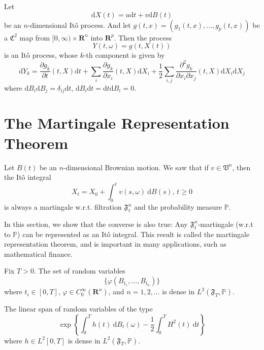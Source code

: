 \begin{theorem}
    Let
    \[
        \mathrm{d}X(t) = u \mathrm{d}t + v \mathrm{d}B(t)
    \]
    be an $n$-dimensional Itô process. And let $g(t,x) = (g_1(t,x), \ldots, g_p(t,x))$ be a $\mathfrak{C}^2$ map from $[0, \infty) \times \textbf{R}^n$ into $\textbf{R}^p$. Then the process 
    \[
        Y(t, \omega) = g(t, X(t))
    \]
    is an Itô process, whose $k$-th component is given by 
    \[
        \mathrm{d}Y_k = \frac{\partial g_k}{\partial t}(t, X) \mathrm{d}t + \sum_i \frac{\partial g_k}{\partial x_i}(t, X) \mathrm{d}X_i + \frac{1}{2} \sum_{i,j} \frac{\partial^2 g_k}{\partial x_i \partial x_j} (t,X) \mathrm{d}X_i \mathrm{d}X_j
    \]
    where $\mathrm{d}B_i \mathrm{d}B_j = \delta_{ij}\mathrm{d}t$, $\mathrm{d}B_i \mathrm{d}t = \mathrm{d}t \mathrm{d}B_i = 0$.
\end{theorem}

\section{The Martingale Representation Theorem}

Let $B(t)$ be an $n$-dimensional Brownian motion. We saw that if $v \in \mathfrak{V}^n$, then the Itô integral
\begin{equation*}
    X_t = X_0 + \int_0^t v(s, \omega) ~\mathrm{d}B(s), \, t \geq 0
\end{equation*}
is always a martingale w.r.t. filtration $\mathfrak{F}_t^n$ and the probability measure $\mathbb{P}$.

In this section, we show that the converse is also true: Any $\mathfrak{F}_t^n$-martingale (w.r.t to $\mathbb{P}$) can be represented as an Itô integral. This result is called the martingale representation theorem, and is important in many applications, such as mathematical finance.

\begin{lemma}
    Fix $T > 0$. The set of random variables 
    \[
        \{ \varphi(B_{t_1}, \ldots, B_{t_n}) \}
    \]
    where $t_i \in [0, T]$, $\varphi \in C_0^\infty(\textbf{R}^n)$, and $n = 1, 2, \ldots$ is dense in $L^2(\mathfrak{F}_T, \mathbb{P})$.
\end{lemma}

\begin{lemma}
    The linear span of random variables of the type
    \begin{equation*}
        \exp \left\{ \int_0^T h(t) ~\mathrm{d}B_t(\omega) - \frac{1}{2} \int_0^T H^2(t) ~\mathrm{d}t \right\}
    \end{equation*}
    where $h \in L^2[0,T]$ is dense in $L^2(\mathfrak{F}_T, \mathbb{P})$.
\end{lemma}

